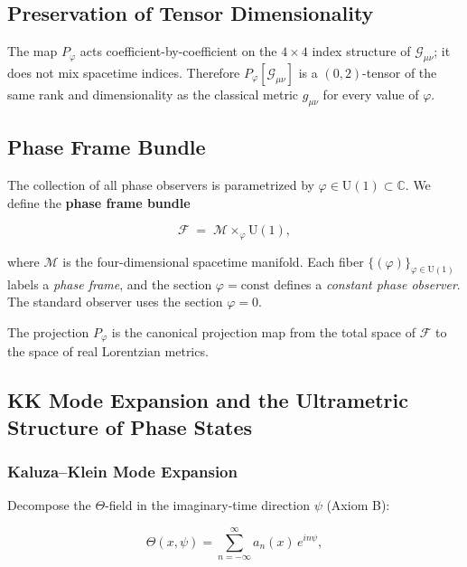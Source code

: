 \subsection{Preservation of Tensor Dimensionality}

The map $P_\varphi$ acts coefficient-by-coefficient on the $4\times 4$ index structure of
$\mathcal{G}_{\mu\nu}$; it does not mix spacetime indices.  Therefore
$P_\varphi[\mathcal{G}_{\mu\nu}]$ is a $(0,2)$-tensor of the same rank and dimensionality as the
classical metric $g_{\mu\nu}$ for every value of $\varphi$.

\subsection{Phase Frame Bundle}

The collection of all phase observers is parametrized by $\varphi \in \mathrm{U}(1) \subset \mathbb{C}$.
We define the \textbf{phase frame bundle}

\begin{equation}
\mathcal{F} \;=\; \mathcal{M} \times_{\varphi} \mathrm{U}(1),
\end{equation}

where $\mathcal{M}$ is the four-dimensional spacetime manifold.  Each fiber $\{(\varphi)\}_{\varphi\in\mathrm{U}(1)}$
labels a \emph{phase frame}, and the section $\varphi = \mathrm{const}$ defines a \emph{constant phase
observer}.  The standard observer uses the section $\varphi = 0$.

The projection $P_\varphi$ is the canonical projection map from the total space of $\mathcal{F}$ to the
space of real Lorentzian metrics.

\subsection{KK Mode Expansion and the Ultrametric Structure of Phase States}
\label{subsec:kk_ultrametric}

\subsubsection{Kaluza--Klein Mode Expansion}

Decompose the $\Theta$-field in the imaginary-time direction $\psi$ (Axiom B):

\begin{equation}
\label{eq:kk_expansion}
\Theta(x, \psi) = \sum_{n=-\infty}^{\infty} a_n(x)\,e^{in\psi},
\end{equation}

